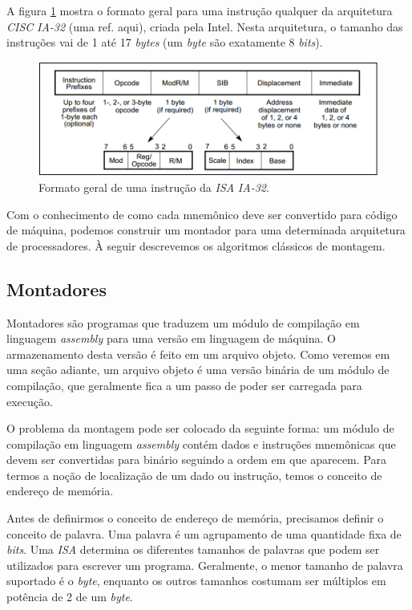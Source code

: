 A figura \ref{instrucoes_ia32} mostra o formato geral para uma instrução qualquer da arquitetura \textit{CISC} \textit{IA-32} (uma ref. aqui), criada pela Intel. Nesta arquitetura, o tamanho das instruções vai de 1 até 17 \textit{bytes} (um \textit{byte} são exatamente 8 \textit{bits}).

\begin{figure}[ptb]
  \begin{center}
    \includegraphics[scale=.45]{imagens/instrucoes_ia32}
  \end{center}
  \caption{Formato geral de uma instrução da \textit{ISA} \textit{IA-32}.}
  \label{instrucoes_ia32}
\end{figure}

Com o conhecimento de como cada mnemônico deve ser convertido para código de máquina, podemos construir um montador para uma determinada arquitetura de processadores. À seguir descrevemos os algoritmos clássicos de montagem.

\subsection{Montadores}

Montadores são programas que traduzem um módulo de compilação em linguagem \textit{assembly} para uma versão em linguagem de máquina. O armazenamento desta versão é feito em um arquivo objeto. Como veremos em uma seção adiante, um arquivo objeto é uma versão binária de um módulo de compilação, que geralmente fica a um passo de poder ser carregada para execução.

O problema da montagem pode ser colocado da seguinte forma: um módulo de compilação em linguagem \textit{assembly} contém dados e instruções mnemônicas que devem ser convertidas para binário seguindo a ordem em que aparecem. Para termos a noção de localização de um dado ou instrução, temos o conceito de endereço de memória.

Antes de definirmos o conceito de endereço de memória, precisamos definir o conceito de palavra. Uma palavra é um agrupamento de uma quantidade fixa de \textit{bits}. Uma \textit{ISA} determina os diferentes tamanhos de palavras que podem ser utilizados para escrever um programa. Geralmente, o menor tamanho de palavra suportado é o \textit{byte}, enquanto os outros tamanhos costumam ser múltiplos em potência de 2 de um \textit{byte}.

